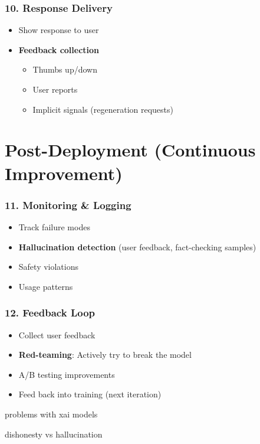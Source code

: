 \subsubsection{10. Response Delivery}
\begin{itemize}[leftmargin=*]
    \item Show response to user
    \item \textbf{Feedback collection }
    \begin{itemize}
        \item Thumbs up/down
        \item User reports
        \item Implicit signals (regeneration requests)
    \end{itemize}
\end{itemize}

\section{Post-Deployment (Continuous Improvement)}

\subsubsection{11. Monitoring \& Logging }
\begin{itemize}[leftmargin=*]
    \item Track failure modes
    \item \textbf{Hallucination detection} (user feedback, fact-checking samples)
    \item Safety violations
    \item Usage patterns
\end{itemize}

\subsubsection{12. Feedback Loop }
\begin{itemize}[leftmargin=*]
    \item Collect user feedback
    \item \textbf{Red-teaming}: Actively try to break the model
    \item A/B testing improvements
    \item Feed back into training (next iteration)
\end{itemize}

problems with xai models

dishonesty vs hallucination

